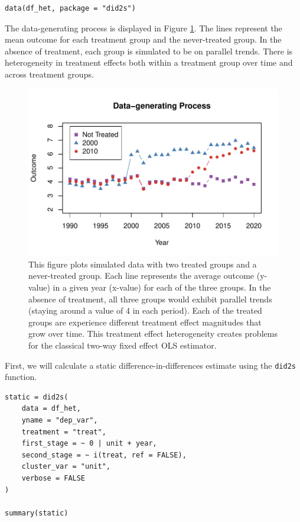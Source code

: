 \begin{verbatim}
data(df_het, package = "did2s")
\end{verbatim}

The data-generating process is displayed in Figure \ref{fig:ex-data}. The lines represent the mean outcome for each treatment group and the never-treated group. In the absence of treatment, each group is simulated to be on parallel trends. There is heterogeneity in treatment effects both within a treatment group over time and across treatment groups.

\begin{figure}
\includegraphics[width=1\linewidth]{RJ-2022-048_files/figure-latex/ex-data-1} \caption{This figure plots simulated data with two treated groups and a never-treated group. Each line represents the average outcome (y-value) in a given year (x-value) for each of the three groups. In the absence of treatment, all three groups would exhibit parallel trends (staying around a value of 4 in each period). Each of the treated groups are experience different treatment effect magnitudes that grow over time. This treatment effect heterogeneity creates problems for the classical two-way fixed effect OLS estimator.}\label{fig:ex-data}
\end{figure}

First, we will calculate a static difference-in-differences estimate using the \texttt{did2s} function.

\begin{verbatim}
static = did2s(
    data = df_het, 
    yname = "dep_var", 
    treatment = "treat",
    first_stage = ~ 0 | unit + year, 
    second_stage = ~ i(treat, ref = FALSE),
    cluster_var = "unit", 
    verbose = FALSE
)

summary(static)
\end{verbatim}

